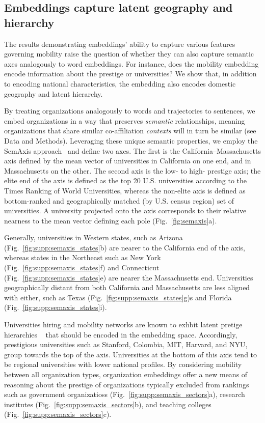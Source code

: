 \documentclass[12pt]{article} %
\begin{document}
%
%
\subsection*{Embeddings capture latent geography and hierarchy}

The results demonstrating embeddings' ability to capture various features governing mobility raise the question of whether they can also capture semantic axes analogously to word embeddings. 
For instance, does the mobility embedding encode information about the prestige or universities?
We show that, in addition to encoding national characteristics, the embedding also encodes domestic geography and latent hierarchy.

By treating organizations analogously to words and trajectories to sentences, we embed organizations in a way that preserves \textit{semantic} relationships, meaning organizations that share similar co-affiliation \textit{contexts} will in turn be similar (see Data and Methods). 
Leveraging these unique semantic properties, we employ the SemAxis approach~\autocite{an2018semaxis} and define two axes.
The first is the California--Massachusetts axis defined by the mean vector of universities in California on one end, and in Massachusetts on the other. 
The second axis is the low- to high- prestige axis;
the elite end of the axis is defined as the top 20 U.S. universities according to the Times Ranking of World Universities, whereas the non-elite axis is defined as bottom-ranked and geographically matched (by U.S. census region) set of universities.
A university projected onto the axis corresponds to their relative nearness to the mean vector defining each pole (Fig.~\ref{fig:semaxis}a).

Generally, universities in Western states, such as Arizona (Fig.~\ref{fig:supp:semaxis_states}b) are nearer to the California end of the axis, whereas states in the Northeast such as New York (Fig.~\ref{fig:supp:semaxis_states}f) and Connecticut (Fig.~\ref{fig:supp:semaxis_states}e) are nearer the Massachusetts end.
Universities geographically distant from both California and Massachusetts are less aligned with either, such as Texas (Fig.~\ref{fig:supp:semaxis_states}g)s and Florida (Fig.~\ref{fig:supp:semaxis_states}i).

Universities hiring and mobility networks are known to exhbit latent pretige hierarchies ~\autocite{deville2014career, clauset2015hierarchy} that should be encoded in the embedding space.
Accordingly, prestigious universities such as Stanford, Colombia, MIT, Harvard, and NYU, group towards the top of the axis.
Universities at the bottom of this axis tend to be regional universities with lower national profiles.
By considering mobility between all organization types, organization embeddings offer a new means of reasoning about the prestige of organizations typically excluded from rankings such as government organizatioss (Fig.~\ref{fig:supp:semaxis_sectors}a), research institutes (Fig.~\ref{fig:supp:semaxis_sectors}b), and teaching colleges (Fig.~\ref{fig:supp:semaxis_sectors}c).
\end{document}
